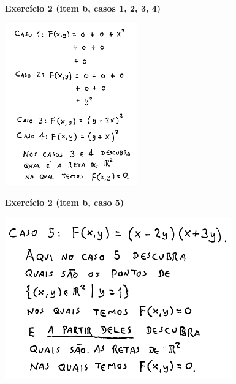 \documentclass[oneside,12pt]{article}
\begin{document}
\newpage

{\bf Exercício 2 (item b, casos 1, 2, 3, 4)}

\includegraphics[height=7cm]{2020-1-C3/20201125_120703_exerc_2b_casos_1234.pdf}

\newpage

{\bf Exercício 2 (item b, caso 5)}

\includegraphics[height=7cm]{2020-1-C3/20201125_120744_exerc_2b_caso_5.pdf}




\end{document}
